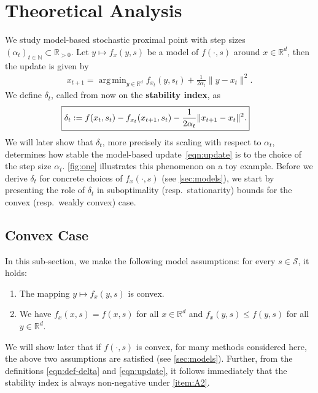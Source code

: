 \documentclass{article}
\DeclareMathOperator*{\argmin}{arg\,min}
\newcommand{\R}{\mathbb{R}}
\newcommand{\N}{\mathbb{N}}
\theoremstyle{plain}
\newtheorem{lemma}[theorem]{Lemma}
\theoremstyle{definition}
\theoremstyle{remark}
\begin{document}

\section{Theoretical Analysis}\label{sec:theory}
We study model-based stochastic proximal point with step sizes $(\alpha_t)_{t\in \N} \subset \R_{> 0}$. Let $y\mapsto f_x(y,s)$ be a  model of $f(\cdot,s)$ around $x\in \R^d$, then the update is given by
\begin{align}\label{eqn:update}
    x_{t+1} = \argmin_{y \in \R^d} f_{x_t}(y,s_t) + \frac{1}{2\alpha_t}\|y-x_t\|^2.
\end{align}
%
We define $\delta_t$, called from now on the \textbf{stability index}, as
\begin{align}\label{eqn:def-delta}
\hspace{-2ex}\boxed{
    \delta_t := f(x_t,s_t) - f_{x_t}(x_{t+1},s_t) - \frac{1}{2\alpha_t}\|x_{t+1}-x_t\|^2.
} 
\end{align}
%
We will later show that $\delta_t$, more precisely its scaling with respect to $\alpha_t$, determines how stable the model-based update~\eqref{eqn:update} is to the choice of the step size $\alpha_t$. \cref{fig:one} illustrates this phenomenon on a toy example. Before we derive  $\delta_t$ for concrete choices of $f_x(\cdot,s)$ (see \cref{sec:models}), we start by presenting the role of $\delta_t$ in suboptimality (resp.\ stationarity) bounds for the convex (resp.\ weakly convex) case. 

\subsection{Convex Case}\label{sec:theory-convex}
%
In this sub-section, we make the following model assumptions: for every $s\in \mathcal{S}$, it holds:
\begin{enumerate}[label=(A\arabic*)]
    \item\label{item:A1} The mapping $y\mapsto f_x(y,s)$ is convex.
    \item\label{item:A2} We have $f_x(x,s) = f(x,s)$ for all $x\in \R^d$ and $f_x(y,s) \leq f(y,s)$ for all $y\in \R^d$.
\end{enumerate}
%
We will show later that if $f(\cdot,s)$ is convex, for many methods considered here, the above two assumptions are satisfied (see \cref{sec:models}).
%
Further, from the definitions \eqref{eqn:def-delta} and \eqref{eqn:update}, it follows immediately that the stability index is always non-negative under \ref{item:A2}.
\end{document}
